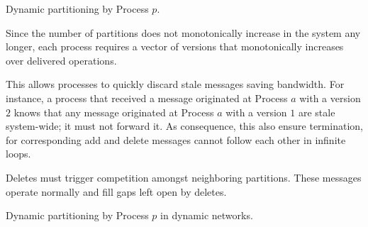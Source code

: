 \begin{algorithm}
  
  \caption{\label{algo:adddelundo}Dynamic partitioning by Process $p$.}
\end{algorithm}


Since the number of partitions does not monotonically increase in the
system any longer, each process requires a vector of versions that
monotonically increases over delivered operations.

This allows processes to quickly discard stale messages saving
bandwidth. For instance, a process that received a message originated
at Process $a$ with a version $2$ knows that any message originated at
Process $a$ with a version $1$ are stale system-wide; it must not
forward it. As consequence, this also ensure termination, for
corresponding add and delete messages cannot follow each other in
infinite loops.

\noindent Deletes must trigger competition amongst neighboring
partitions. These  messages operate normally and fill gaps
left open by deletes. 


\begin{algorithm}
  
  \caption{\label{algo:edges}Dynamic partitioning by Process $p$ in dynamic networks.}
\end{algorithm}








